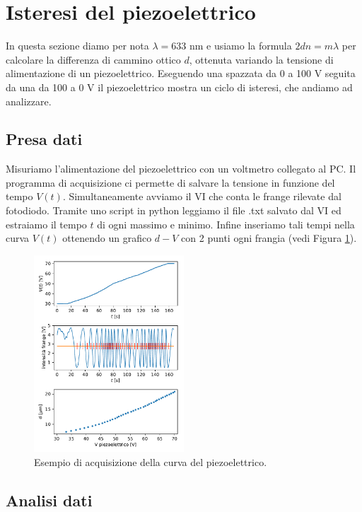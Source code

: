 \documentclass[a4paper]{article}
\begin{document}
\section{Isteresi del piezoelettrico}

In questa sezione diamo per nota $\lambda = 633$ nm e usiamo la formula $2dn = m\lambda$ per calcolare la differenza di cammino ottico $d$, ottenuta variando la tensione di alimentazione di un piezoelettrico. Eseguendo una spazzata da 0 a 100 V seguita da una da 100 a 0 V il piezoelettrico mostra un ciclo di isteresi, che andiamo ad analizzare.

\subsection{Presa dati}
Misuriamo l'alimentazione del piezoelettrico con un voltmetro collegato al PC. Il programma di acquisizione ci permette di salvare la tensione in funzione del tempo $V(t)$.
Simultaneamente avviamo il VI che conta le frange rilevate dal fotodiodo. Tramite uno script in python leggiamo il file .txt salvato dal VI ed estraiamo il tempo $t$ di ogni massimo e minimo. Infine inseriamo tali tempi nella curva $V(t)$ ottenendo un grafico $d-V$ con 2 punti ogni frangia (vedi Figura \ref{fig:esempio_acquisizione_isteresi}).

\begin{figure}[H]
	\includegraphics[width=0.5\textwidth]{esempio_acquisizione_isteresi.pdf}
	\caption{Esempio di acquisizione della curva del piezoelettrico.}
	\label{fig:esempio_acquisizione_isteresi}
\end{figure}

\subsection{Analisi dati}
\end{document}
